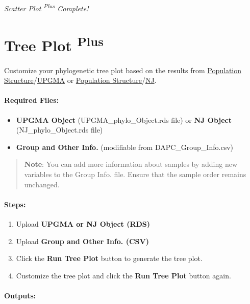 \documentclass[
]{book}
\providecommand{\tightlist}{%
  \setlength{\itemsep}{0pt}\setlength{\parskip}{0pt}}
\begin{document}
\emph{Scatter Plot \textsuperscript{Plus} Complete!}

\section{\texorpdfstring{Tree Plot \textsuperscript{Plus}}{Tree Plot Plus}}\label{tree-plot-plus}

Customize your phylogenetic tree plot based on the results from \ul{Population Structure}/\ul{UPGMA} or \ul{Population Structure}/\ul{NJ}.

\paragraph*{Required Files:}\label{required-files-1}

\begin{itemize}
\tightlist
\item
  \textbf{UPGMA Object} (UPGMA\_phylo\_Object.rds file) or \textbf{NJ Object} (NJ\_phylo\_Object.rds file)
\item
  \textbf{Group and Other Info.} (modifiable from DAPC\_Group\_Info.csv)
\end{itemize}

\begin{quote}
\textbf{Note}: You can add more information about samples by adding new variables to the Group Info. file. Ensure that the sample order remains unchanged.
\end{quote}

\paragraph*{\texorpdfstring{\textbf{Steps:}}{Steps:}}\label{steps-4}

\begin{enumerate}
\def\labelenumi{\arabic{enumi}.}
\item
  {Upload} \textbf{UPGMA or NJ Object (RDS)}
\item
  {Upload} \textbf{Group and Other Info. (CSV)}
\item
  Click the {\textbf{Run Tree Plot}} button to generate the tree plot.
\item
  Customize the tree plot and click the {\textbf{Run Tree Plot}} button again.
\end{enumerate}

\paragraph*{Outputs:}\label{outputs-11}
\end{document}

